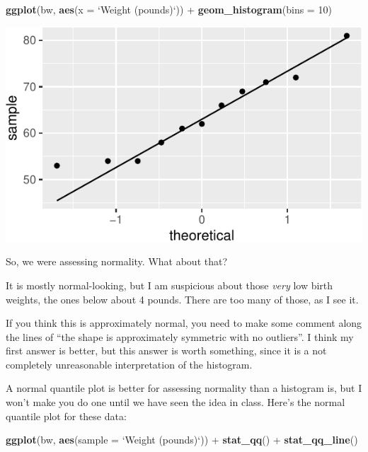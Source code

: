\documentclass[]{tufte-book}
\newenvironment{Shaded}{}{}
\newcommand{\DataTypeTok}[1]{\textcolor[rgb]{0.56,0.13,0.00}{#1}}
\newcommand{\DecValTok}[1]{\textcolor[rgb]{0.25,0.63,0.44}{#1}}
\newcommand{\KeywordTok}[1]{\textcolor[rgb]{0.00,0.44,0.13}{\textbf{#1}}}
\newcommand{\NormalTok}[1]{#1}
\newcommand{\OperatorTok}[1]{\textcolor[rgb]{0.40,0.40,0.40}{#1}}
\newcommand{\StringTok}[1]{\textcolor[rgb]{0.25,0.44,0.63}{#1}}
\theoremstyle{definition}
\theoremstyle{definition}
\theoremstyle{definition}
\theoremstyle{remark}
\begin{document}
\begin{Shaded}
\begin{Highlighting}[]
\KeywordTok{ggplot}\NormalTok{(bw, }\KeywordTok{aes}\NormalTok{(}\DataTypeTok{x =} \StringTok{`}\DataTypeTok{Weight (pounds)}\StringTok{`}\NormalTok{)) }\OperatorTok{+}\StringTok{ }\KeywordTok{geom_histogram}\NormalTok{(}\DataTypeTok{bins =} \DecValTok{10}\NormalTok{)}
\end{Highlighting}
\end{Shaded}

\includegraphics{04-one-sample-inference_files/figure-latex/unnamed-chunk-17-1}

So, we were assessing normality. What about that?

It is mostly normal-looking, but I am suspicious about those \emph{very}
low birth weights, the ones below about 4 pounds. There are too many of
those, as I see it.

If you think this is approximately normal, you need to make some comment
along the lines of ``the shape is approximately symmetric with no
outliers''. I think my first answer is better, but this answer is worth
something, since it is a not completely unreasonable interpretation of
the histogram.

A normal quantile plot is better for assessing normality than a
histogram is, but I won't make you do one until we have seen the idea in
class. Here's the normal quantile plot for these data:

\begin{Shaded}
\begin{Highlighting}[]
\KeywordTok{ggplot}\NormalTok{(bw, }\KeywordTok{aes}\NormalTok{(}\DataTypeTok{sample =} \StringTok{`}\DataTypeTok{Weight (pounds)}\StringTok{`}\NormalTok{)) }\OperatorTok{+}\StringTok{ }
\StringTok{    }\KeywordTok{stat_qq}\NormalTok{() }\OperatorTok{+}\StringTok{ }\KeywordTok{stat_qq_line}\NormalTok{()}
\end{Highlighting}
\end{Shaded}
\end{document}
